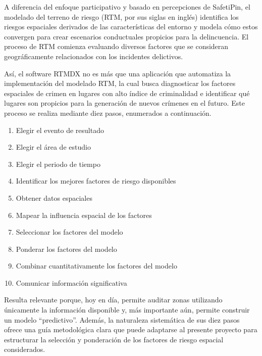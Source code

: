 
A diferencia del enfoque participativo y basado en percepciones de SafetiPin, el modelado del terreno de riesgo (RTM, por sus siglas en inglés) identifica los riesgos espaciales derivados de las características del entorno y modela cómo estos convergen para crear escenarios conductuales propicios para la delincuencia. El proceso de RTM comienza evaluando diversos factores que se consideran geográficamente relacionados con los incidentes delictivos\cite{caplan2016}.

Así, el software RTMDX no es más que una aplicación que automatiza la implementación del modelado RTM, la cual busca diagnosticar los factores espaciales de crimen en lugares con alto índice de criminalidad e identificar qué lugares son propicios para la generación de nuevos crímenes en el futuro. Este proceso se realiza mediante diez pasos, enumerados a continuación\cite{caplan2016}. 

\begin{enumerate}
    \item Elegir el evento de resultado
    \item Elegir el área de estudio
    \item Elegir el periodo de tiempo
    \item Identificar los mejores factores de riesgo disponibles
    \item Obtener datos espaciales
    \item Mapear la influencia espacial de los factores
    \item Seleccionar los factores del modelo
    \item Ponderar los factores del modelo
    \item Combinar cuantitativamente los factores del modelo
    \item Comunicar información significativa
\end{enumerate}

Resulta relevante porque, hoy en día, permite auditar zonas utilizando únicamente la información disponible y, más importante aún, permite construir un modelo \enquote{predictivo}. Además, la naturaleza sistemática de sus diez pasos ofrece una guía metodológica clara que puede adaptarse al presente proyecto para estructurar la selección y ponderación de los factores de riesgo espacial considerados.

